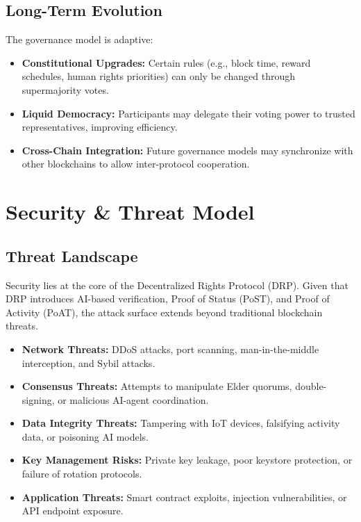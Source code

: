\documentclass[11pt,a4paper]{article}
\begin{document}
\subsection{Long-Term Evolution}
The governance model is adaptive:
\begin{itemize}
    \item \textbf{Constitutional Upgrades:} Certain rules (e.g., block time, reward schedules, human rights priorities) can only be changed through supermajority votes.
    \item \textbf{Liquid Democracy:} Participants may delegate their voting power to trusted representatives, improving efficiency.
    \item \textbf{Cross-Chain Integration:} Future governance models may synchronize with other blockchains to allow inter-protocol cooperation.
\end{itemize}


\section{Security \& Threat Model}

\subsection{Threat Landscape}
Security lies at the core of the Decentralized Rights Protocol (DRP). Given that DRP introduces AI-based verification, Proof of Status (PoST), and Proof of Activity (PoAT), the attack surface extends beyond traditional blockchain threats.

\begin{itemize}
    \item \textbf{Network Threats:} DDoS attacks, port scanning, man-in-the-middle interception, and Sybil attacks.
    \item \textbf{Consensus Threats:} Attempts to manipulate Elder quorums, double-signing, or malicious AI-agent coordination.
    \item \textbf{Data Integrity Threats:} Tampering with IoT devices, falsifying activity data, or poisoning AI models.
    \item \textbf{Key Management Risks:} Private key leakage, poor keystore protection, or failure of rotation protocols.
    \item \textbf{Application Threats:} Smart contract exploits, injection vulnerabilities, or API endpoint exposure.
\end{itemize}
\end{document}

